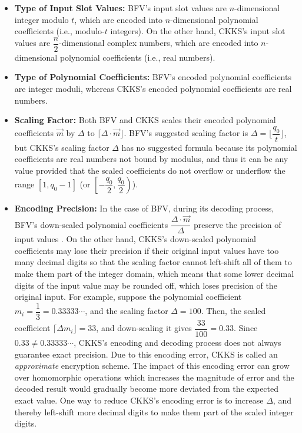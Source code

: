 \begin{itemize}
\item \textbf{Type of Input Slot Values:} BFV's input slot values are ${n}$-dimensional integer modulo $t$, which are encoded into $n$-dimensional polynomial coefficients (i.e., modulo-$t$ integers). On the other hand, CKKS's input slot values are $\dfrac{n}{2}$-dimensional complex numbers, which are encoded into $n$-dimensional polynomial coefficients (i.e., real numbers). 

\item \textbf{Type of Polynomial Coefficients:} BFV's encoded polynomial coefficients are integer moduli, whereas CKKS's encoded polynomial coefficients are real numbers. 

\item \textbf{Scaling Factor:} Both BFV and CKKS scales their encoded polynomial coefficients $\vec{m}$ by $\Delta$ to $\lceil \Delta\cdot \vec{m} \rfloor$. BFV's suggested scaling factor is $\Delta = \lfloor\dfrac{q_0}{t}\rfloor$, but CKKS's scaling factor $\Delta$ has no suggested formula because its polynomial coefficients are real numbers not bound by modulus, and thus it can be any value provided that the scaled coefficients do not overflow or underflow the range $[1, q_0 - 1]$ (or $\left[-\dfrac{q_0}{2}, \dfrac{q_0}{2}\right)$). 

\item \textbf{Encoding Precision:} In the case of BFV, during its decoding process, BFV's down-scaled polynomial coefficients $\dfrac{ \Delta\cdot \vec{m} }{\Delta}$ preserve the precision of input values 
. On the other hand, CKKS's down-scaled polynomial coefficients may lose their precision if their original input values have too many decimal digits so that the scaling factor cannot left-shift all of them to make them part of the integer domain, which means that some lower decimal digits of the input value may be rounded off, which loses precision of the original input. For example, suppose the polynomial coefficient $m_i = \dfrac{1}{3} = 0.33333\cdots$, and the scaling factor $\Delta = 100$. Then, the scaled coefficient $\lceil \Delta m_i \rfloor = 33$, and down-scaling it gives $\dfrac{33}{100} = 0.33$. Since $0.33 \neq 0.33333\cdots$, CKKS's encoding and decoding process does not always guarantee exact precision. Due to this encoding error, CKKS is called an \textit{approximate} encryption scheme. The impact of this encoding error can grow over homomorphic operations which increases the magnitude of error and the decoded result would gradually become more deviated from the expected exact value. One way to reduce CKKS's encoding error is to increase $\Delta$, and thereby left-shift more decimal digits to make them part of the scaled integer digits.  

\end{itemize}


